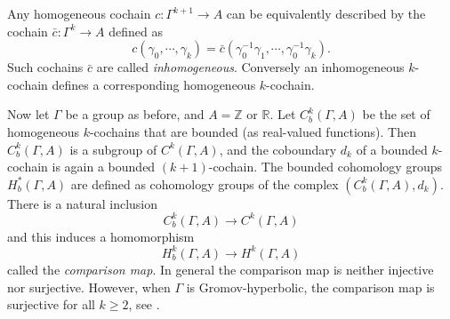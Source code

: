 \documentclass[11pt]{amsart}
\theoremstyle{remark}
\theoremstyle{definition}
\begin{document}
	Any homogeneous cochain $c \colon \Gamma^{k+1} \rightarrow A$ can be equivalently described by the cochain $\bar{c} \colon \Gamma^k \rightarrow A$ defined as 
	\[ c(\gamma_0, \cdots , \gamma_k) = \bar{c}(\gamma_0^{-1} \gamma_1, \cdots, \gamma_0^{-1} \gamma_k). \]
	Such cochains $\bar{c}$ are called \emph{inhomogeneous}. Conversely an inhomogeneous $k$-cochain defines a corresponding homogeneous $k$-cochain.
	
	Now let $\Gamma$ be a group as before, and $A = \mathbb{Z}$ or $\mathbb{R}$. Let $C^k_b(\Gamma , A)$ be the set of homogeneous $k$-cochains that are bounded (as real-valued functions). Then $C^k_b(\Gamma , A)$ is a subgroup of $C^k(\Gamma , A)$, and the coboundary $d_k$ of a bounded $k$-cochain is again a bounded $(k+1)$-cochain. The bounded cohomology groups $H^*_b(\Gamma , A)$ are defined as cohomology groups of the complex $(C^k_b(\Gamma, A), d_k)$. There is a natural inclusion 
	\[ C^k_b(\Gamma, A) \rightarrow C^{k}(\Gamma , A) \]
	and this induces a homomorphism 
	\[ H^k_b(\Gamma, A) \rightarrow H^k(\Gamma , A)\] 
	called the \emph{comparison map}. In general the comparison map is neither injective nor surjective. However, when $\Gamma$ is Gromov-hyperbolic, the comparison map is surjective for all $k \geq 2$, see \cite{mineyev2001straightening}. 
	
\end{document}
